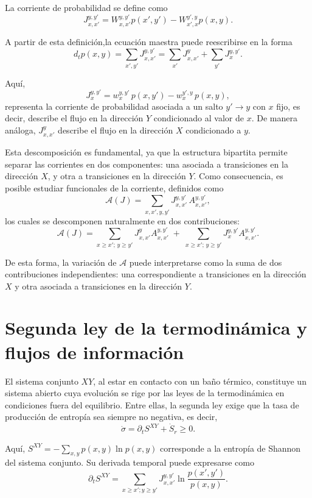 La corriente de probabilidad se define como
\[
J_{x,x'}^{y,y'} = W_{x,x'}^{y,y'}p(x',y') - W_{x',x}^{y',y}p(x,y).
\]

A partir de esta definición,la ecuación maestra puede reescribirse en la forma
\[
d_{t}p(x,y) = \sum_{x',y'}J_{x,x'}^{y,y'} = \sum_{x'}J_{x,x'}^{y} + \sum_{y'}J_{x}^{y,y'}.
\]

Aquí,
\[
J_{x}^{y,y'} = w_{x}^{y,y'}\,p(x,y') - w_{x}^{y',y}\,p(x,y),
\]
representa la corriente de probabilidad asociada a un salto \(y' \to y\) con \(x\) fijo, es decir, describe el flujo en la dirección \( Y \) condicionado al valor de \(x\). De manera análoga, \( J^{y}_{x,x'} \) describe el flujo en la dirección \( X \) condicionado a \(y\).  

Esta descomposición es fundamental, ya que la estructura bipartita permite separar las corrientes en dos componentes: una asociada a transiciones en la dirección \(X\), y otra a transiciones en la dirección \(Y\). Como consecuencia, es posible estudiar funcionales de la corriente, definidos como
\[
\mathcal{A}(J) = \sum_{x,x',y,y'} J_{x,x'}^{y,y'}\, A_{x,x'}^{y,y'},
\]
los cuales se descomponen naturalmente en dos contribuciones:
\begin{equation}
\mathcal{A}(J) = \sum_{x\geq x';\,y\geq y'} J_{x,x'}^{y}A_{x,x'}^{y,y'} \;+\; \sum_{x\geq x';\,y\geq y'} J_{x}^{y,y'} A_{x,x'}^{y,y'}.
\label{sec4:functionalcurrent}
\end{equation}

De esta forma, la variación de \(\mathcal{A}\) puede interpretarse como la suma de dos contribuciones independientes: una correspondiente a transiciones en la dirección \(X\) y otra asociada a transiciones en la dirección \(Y\).

\label{sec4:flujos}
\section{Segunda ley de la termodinámica y flujos de información}

El sistema conjunto \(XY\), al estar en contacto con un baño térmico, constituye un sistema abierto cuya evolución se rige por las leyes de la termodinámica en condiciones fuera del equilibrio. Entre ellas, la segunda ley exige que la tasa de producción de entropía sea siempre no negativa, es decir,
\begin{equation*}
    \dot{\sigma} = \partial_{t}S^{XY} + \dot{S}_{r} \geq 0. 
\end{equation*}

Aquí, \( S^{XY} = - \sum_{x,y} p(x,y) \ln p(x,y) \) corresponde a la entropía de Shannon del sistema conjunto. Su derivada temporal puede expresarse como
\begin{equation*}
    \partial_{t}S^{XY} = \sum_{x\geq x'; y\geq y'} J_{x,x'}^{y,y'} \ln \frac{p(x',y')}{p(x,y)}.
\end{equation*}

